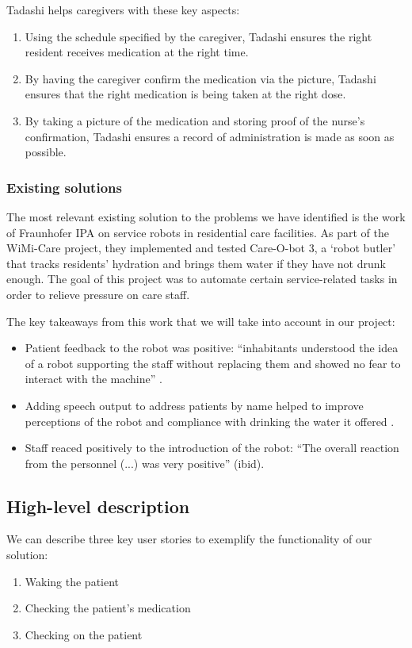 \documentclass{article}
\begin{document}
Tadashi helps caregivers with these key aspects:
\begin{enumerate}
  \item Using the schedule specified by the caregiver, Tadashi ensures the right resident receives medication at the right time.
  \item By having the caregiver confirm the medication via the picture, Tadashi ensures that the right medication is being taken at the right dose.
  \item By taking a picture of the medication and storing proof of the nurse's confirmation, Tadashi ensures a record of administration is made as soon as possible. 
\end{enumerate}

\subsubsection{Existing solutions}
The most relevant existing solution to the problems we have identified is the work of Fraunhofer IPA on service robots in residential care facilities. As part of the WiMi-Care project, they implemented and tested Care-O-bot 3, a `robot butler' that tracks residents' hydration and brings them water if they have not drunk enough. The goal of this project was to automate certain service-related tasks in order to relieve pressure on care staff. \cite{fraunhofer}

The key takeaways from this work that we will take into account in our project:
\begin{itemize}
\item Patient feedback to the robot was positive: ``inhabitants  understood  the  idea  of  a  robot  supporting  the  staff  without replacing them and showed no fear to interact with the machine'' \cite{springer}. 
\item Adding speech output to address patients by name helped to improve perceptions of the robot and compliance with drinking the water it offered \cite{ieee}. 
\item Staff reaced positively to the introduction of the robot: ``The overall reaction from the personnel (...) was very positive'' (ibid). 
\end{itemize}

\subsection{High-level description} 
We can describe three key user stories to exemplify the functionality of our solution:
\begin{enumerate}
\item Waking the patient
\item Checking the patient's medication
\item Checking on the patient
\end{enumerate}
\end{document}
